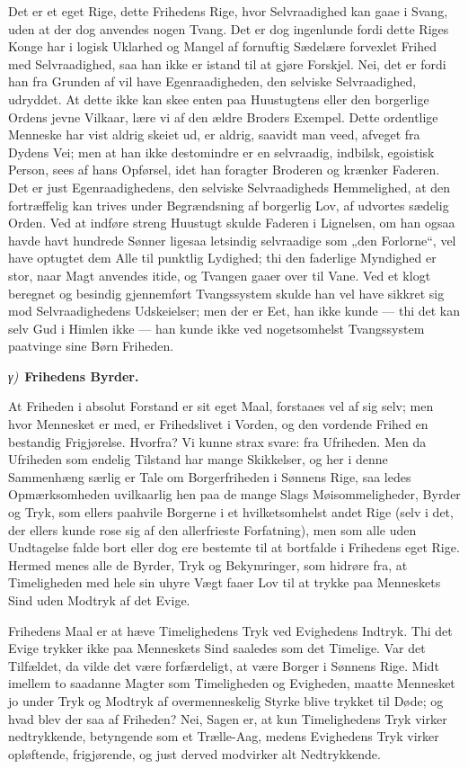 \documentclass[12pt]{book}
\newcommand{\greekrun}[2]{%
  \medskip\begin{center}{\itshape #1)}\ {\bfseries #2}\end{center}\medskip}
\begin{document}
Det er et eget Rige, dette Frihedens Rige, hvor Selvraadighed kan
gaae i Svang, uden at der dog anvendes nogen Tvang. Det er dog
ingenlunde fordi dette Riges Konge har i logisk Uklarhed og Mangel
af fornuftig Sædelære forvexlet Frihed med Selvraadighed, saa han
ikke er istand til at gjøre Forskjel. Nei, det er fordi han fra
Grunden af vil have Egenraadigheden, den selviske Selvraadighed,
udryddet. At dette ikke kan skee enten paa Huustugtens eller den
borgerlige Ordens jevne Vilkaar, lære vi af den ældre Broders
Exempel. Dette ordentlige Menneske har vist aldrig skeiet ud, er
aldrig, saavidt man veed, afveget fra Dydens Vei; men at han ikke
destomindre er en selvraadig, indbilsk, egoistisk Person, sees af
hans Opførsel, idet han foragter Broderen og krænker Faderen. Det er
just Egenraadighedens, den selviske Selvraadigheds Hemmelighed, at
den fortræffelig kan trives under Begrændsning af borgerlig Lov, af
udvortes sædelig Orden. Ved at indføre streng Huustugt skulde
Faderen i Lignelsen, om han ogsaa havde havt hundrede Sønner ligesaa
letsindig selvraadige som „den Forlorne“, vel have optugtet dem Alle
til punktlig Lydighed; thi den faderlige Myndighed er stor, naar
Magt anvendes itide, og Tvangen gaaer over til Vane. Ved et klogt
beregnet og besindig gjennemført Tvangssystem skulde han vel have
sikkret sig mod Selvraadighedens Udskeielser; men der er Eet, han
ikke kunde --- thi det kan selv Gud i Himlen ikke --- han kunde ikke
ved nogetsomhelst Tvangssystem paatvinge sine Børn Friheden.

\greekrun{γ}{Frihedens Byrder.}

At Friheden i absolut Forstand er sit eget Maal, forstaaes vel af
sig selv; men hvor Mennesket er med, er
Frihedslivet i Vorden, og den vordende Frihed en bestandig
Frigjørelse. Hvorfra? Vi kunne strax svare: fra Ufriheden. Men da
Ufriheden som endelig Tilstand har mange Skikkelser, og her i denne
Sammenhæng særlig er Tale om Borgerfriheden i Sønnens Rige, saa
ledes Opmærksomheden uvilkaarlig hen paa de mange Slags
Møisommeligheder, Byrder og Tryk, som ellers paahvile Borgerne i et
hvilketsomhelst andet Rige (selv i det, der ellers kunde rose sig af
den allerfrieste Forfatning), men som alle uden Undtagelse falde
bort eller dog ere bestemte til at bortfalde i Frihedens eget Rige.
Hermed menes alle de Byrder, Tryk og Bekymringer, som hidrøre fra,
at Timeligheden med hele sin uhyre Vægt faaer Lov til at trykke paa
Menneskets Sind uden Modtryk af det Evige.

Frihedens Maal er at hæve Timelighedens Tryk ved Evighedens
Indtryk. Thi det Evige trykker ikke paa Menneskets Sind saaledes som
det Timelige. Var det Tilfældet, da vilde det være forfærdeligt, at
være Borger i Sønnens Rige. Midt imellem to saadanne Magter som
Timeligheden og Evigheden, maatte Mennesket jo under Tryk og Modtryk
af overmenneskelig Styrke blive trykket til Døde; og hvad blev der
saa af Friheden? Nei, Sagen er, at kun Timelighedens Tryk virker
nedtrykkende, betyngende som et Trælle-Aag, medens Evighedens Tryk
virker opløftende, frigjørende, og just derved modvirker alt
Nedtrykkende.
\end{document}
